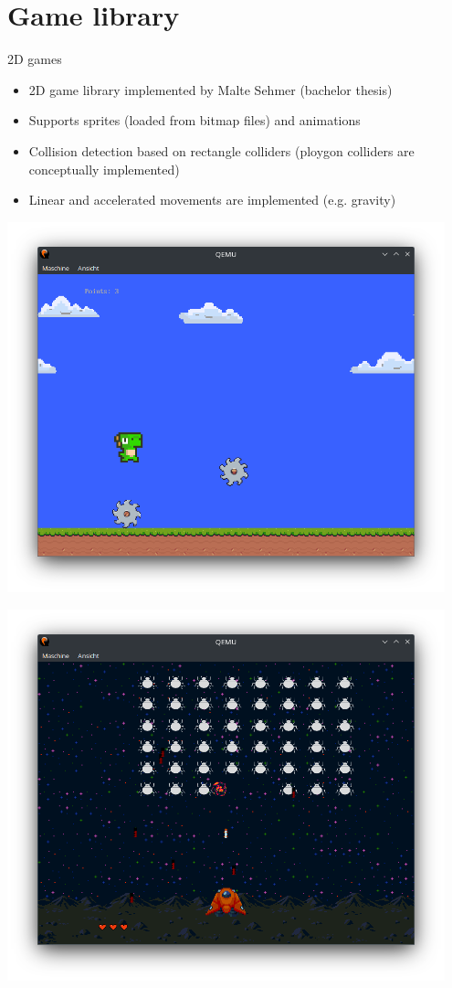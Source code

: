 \section{Game library}

\begin{frame}{2D games}
	\begin{itemize}
		\item 2D game library implemented by Malte Sehmer (bachelor thesis)
		\item Supports sprites (loaded from bitmap files) and animations
		\item Collision detection based on rectangle colliders (ploygon colliders are conceptually implemented)
		\item Linear and accelerated movements are implemented (e.g. gravity)
	\end{itemize}
	\begin{minipage}{0.49\textwidth}
		\includegraphics[width=0.95\textwidth]{img/dino}
	\end{minipage}
	\begin{minipage}{0.49\textwidth}
	\includegraphics[width=0.95\textwidth]{img/bug}

\end{minipage}
\end{frame}
